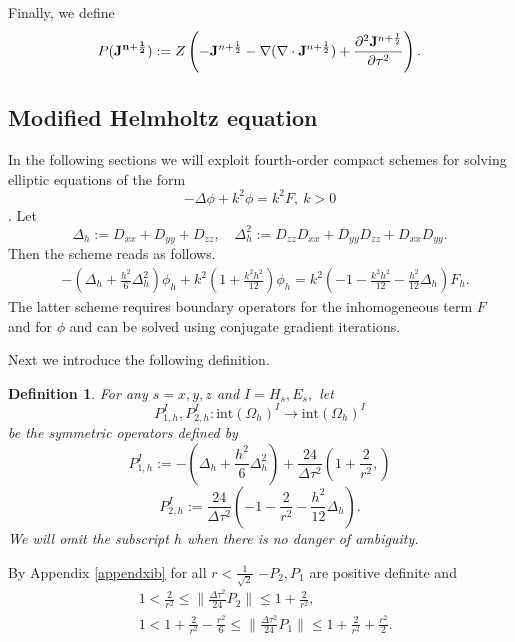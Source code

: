 \documentclass[12pt,reqno]{amsart}
\newtheorem{defi}[theorem]{Definition}
\theoremstyle{definition}
\numberwithin{equation}{section}
\newcommand{\intr}[1]{\mathrm{int}(#1)}
\def\Gwh{\Omega_h}
\begin{document}


	
	Finally, we define 
	$$
	P({\bf J^{n+\frac{1}{2}}}):=Z\left ( -{\bf J}^{n+\frac{1}{2}}-\nabla (\nabla \cdot{\bf J}^{n+\frac{1}{2}})+\frac{\partial^2{\bf J}^{n+\frac{1}{2}}}{\partial \tau^2}\right ).
	$$
   \subsection{Modified Helmholtz equation}\label{subsec:mh}
   In the following sections we will exploit fourth-order compact schemes for solving elliptic equations of the form $$-\Delta \phi+k^2\phi=k^2F, \ k>0$$ \cite{singer_turkel}.
Let 
$$
\Delta_h:=D_{xx}+D_{yy}+D_{zz}, \quad \Delta^2_h:= D_{zz}D_{xx}+D_{yy}D_{zz}+D_{xx}D_{yy}.
$$
Then the scheme reads as follows.
\begin{align*}
	&
	-\left (
	\Delta_h+\frac{h^2}{6}\Delta^2_h
	\right)\phi_h+
	k^2\left (
	1+\frac{k^2h^2}{12}
	\right)\phi_h=
	k^2\left (
	-1-\frac{k^2h^2}{12}
	-\frac{h^2}{12}\Delta_h
	\right)F_h.
\end{align*}
The latter scheme requires boundary operators for the inhomogeneous term $F$ and for $\phi$ and can be solved using conjugate gradient iterations.

Next we introduce the following definition.
	\begin{defi}
	For any $s=x,y,z$ and $I= H_s, E_s,$
	let $$P_{1,h}^{I}, P_{2,h}^{I}:\intr\Gwh^{I}\to \intr\Gwh^{I}$$ be the symmetric operators defined by
	$$
	P_{1,h}^{I}:=-\left (\Delta_h+\frac{h^2}{6}\Delta_h^2\right)+\frac{24}{\Delta \tau^2}\left (
	1+\frac{2}{r^2},
	\right)
	$$
	$$
	P_{2,h}^{I}:=\frac{24}{\Delta \tau^2}\left (
	-1-\frac{2}{r^2}-\frac{h^2}{12}\Delta_h
	\right).
	$$	
We will omit the subscript $h$ when there is no danger of ambiguity.	
	
\end{defi}
By  Appendix \ref{appendxib} for all $r<\frac{1}{\sqrt{2}}$
 $-P_2, P_1$ are positive definite
and
\begin{align}\label{eq:P1P2estimates}
	&
1<\frac{2}{r^2}\leq \|\frac{\Delta \tau^2}{24}P_2\|\leq 1+\frac{2}{r^2},\\&
1<1+\frac{2}{r^2}-\frac{r^2}{6}\leq\|\frac{\Delta \tau^2}{24}P_1\|\leq 1+\frac{2}{r^2}+\frac{r^2}{2}.
\end{align} 
\end{document}
